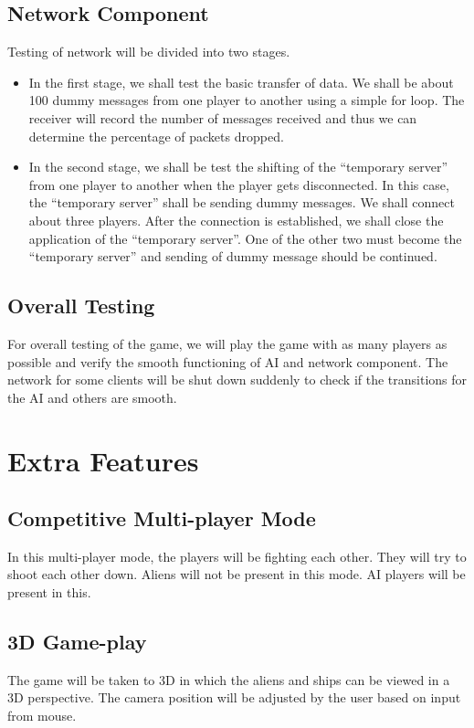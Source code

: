 \documentclass{article}
\begin{document}
			\subsection{Network Component}
				Testing of network will be divided into two stages.
					\begin{itemize}
						\item In the first stage, we shall test the basic transfer of data. We shall be about 100 dummy messages from one player to another using a simple for loop. The receiver will record the number of messages received and thus we can determine the percentage of packets dropped.
						\item In the second stage, we shall be test the shifting of the ``temporary server'' from one player to another when the player gets disconnected. In this case, the ``temporary server'' shall be sending dummy messages. We shall connect about three players. After the connection is established, we shall close the application of the ``temporary server''. One of the other two must become the ``temporary server'' and sending of dummy message should be continued.
					\end{itemize}
			\subsection{Overall Testing}
				For overall testing of the game, we will play the game with as many players as possible and verify the smooth functioning of AI and network component. The network for some clients will be shut down suddenly to check if the transitions for the AI and others are smooth.
	\section{Extra Features}
		\subsection{Competitive Multi-player Mode}
			In this multi-player mode, the players will be fighting each other. They will try to shoot each other down. Aliens will not be present in this mode. AI players will be present in this.
		\subsection{3D Game-play}
			The game will be taken to 3D in which the aliens and ships can be viewed in a 3D perspective. The camera position will be adjusted by the user based on input from mouse.
\end{document}
